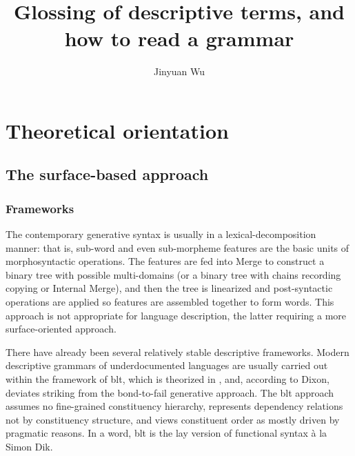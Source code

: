\documentclass[UTF8, a4paper, oneside, scheme=plain]{ctexart}
\title{Glossing of descriptive terms, and how to read a grammar}
\author{Jinyuan Wu}
\newcommand{\ala}{à la}
\begin{document}
\maketitle

\section{Theoretical orientation}\label{sec:theory}

\subsection{The surface-based approach}

\subsubsection{Frameworks}

The contemporary generative syntax is usually in a lexical-decomposition manner:
that is, sub-word and even sub-morpheme features are the basic units of morphosyntactic operations.
The features are fed into Merge to construct a binary tree with possible multi-domains
(or a binary tree with chains recording copying or Internal Merge),
and then the tree is linearized and post-syntactic operations are applied 
so features are assembled together to form words.
This approach is not appropriate for language description,
the latter requiring a more surface-oriented approach.

There have already been several relatively stable descriptive frameworks.
Modern descriptive grammars of underdocumented languages 
are usually carried out within the framework of \ac{blt},
which is theorized in \citet{dixon2009basic1,dixon2010basic2,dixon2012basic3},
and, according to Dixon, deviates striking from the bond-to-fail generative approach.
The \ac{blt} approach assumes no fine-grained constituency hierarchy,
represents dependency relations not by constituency structure,
and views constituent order as mostly driven by pragmatic reasons.
In a word, \ac{blt} is the lay version of functional syntax \ala{} Simon Dik.
\end{document}
